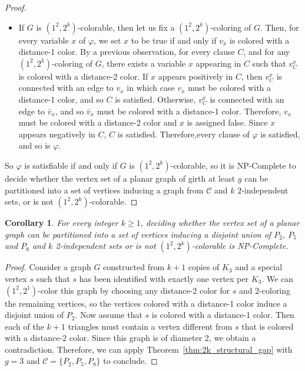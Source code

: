 \documentclass{article}
\newtheorem{corollary}[theorem]{Corollary}
\newcommand{\colo}[2]{(1^{#1}, 2^{#2})}
\begin{document}
\begin{proof}
\begin{itemize}
        \item If $G$ is $\colo{2}{k}$-colorable, then let us fix a $\colo{2}{k}$-coloring of $G$. Then, for every variable $x$ of $\varphi$, we set $x$ to be true if and only if $v_x$ is colored with a distance-1 color. By a previous observation, for every clause $C$, and for any $\colo{2}{k}$-coloring of $G$, there exists a variable $x$ appearing in $C$ such that $v_C^x$ is colored with a distance-2 color. If $x$ appears positively in $C$, then $v_C^x$ is connected with an edge to $v_x$ in which case $v_x$ must be colored with a distance-1 color, and so $C$ is satisfied. Otherwise, $v_C^x$ is connected with an edge to $\bar{v}_x$, and so $\bar{v}_x$ must be colored with a distance-1 color. Therefore, $v_x$ must be colored with a distance-2 color and $x$ is assigned false. Since $x$ appears negatively in $C$, $C$ is satisfied. Therefore,every clause of $\varphi$ is satisfied, and so is $\varphi$.
    \end{itemize}
    So $\varphi$ is satisfiable if and only if $G$ is $\colo{2}{k}$-colorable, so it is NP-Complete to decide whether the vertex set of a planar graph of girth at least $g$ can be partitioned into a set of vertices inducing a graph from $\mathcal{C}$ and $k$ $2$-independent sets, or is not $\colo{2}{k}$-colorable.
\end{proof}



\begin{corollary}\label{coro:2k_gap_strutrural}
    For every integer $k \geq 1$, deciding whether the vertex set of a planar graph can be partitioned into a set of vertices inducing a disjoint union of $P_2$, $P_5$ and $P_8$ and $k$ 2-independent sets or is not $\colo{2}{k}$-colorable is NP-Complete. 
\end{corollary}

\begin{proof}

Consider a graph $G$ constructed from $k + 1$ copies of $K_3$ and a special vertex $s$ such that $s$ has been identified with exactly one vertex per $K_3$. We can $\colo{2}{1}$-color this graph by choosing any distance-2 color for $s$ and 2-coloring the remaining vertices, so the vertices colored with a distance-1 color induce a disjoint union of $P_2$. Now assume that $s$ is colored with a distance-1 color. Then each of the $k + 1$ triangles must contain a vertex different from $s$ that is colored with a distance-2 color. Since this graph is of diameter 2, we obtain a contradiction. Therefore, we can apply Theorem~\ref{thm:2k_structural_gap} with $g = 3$ and $\mathcal{C} = \{P_2, P_5, P_8\}$ to conclude.
\end{proof}
\end{document}
